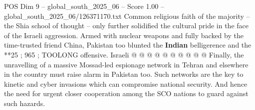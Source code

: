 \begin{textsample}{POS Dim 9 – global\_south\_2025\_06 – Score 1.00 – global\_south\_2025\_06/126371170.txt}
Common religious faith of the majority -- the Shia school of thought -- only further solidified the cultural pride in the face of the Israeli aggression.
Armed with nuclear weapons and fully backed by the time-trusted friend China, Pakistan too blunted the \textbf{Indian} belligerence and the **25 ; 965 ; TOOLONG offensive.
Israeli @ @ @ @ @ @ @ @ @ @ Finally, the unravelling of a massive Mossad-led espionage network in Tehran and elsewhere in the country must raise alarm in Pakistan too.
Such networks are the key to kinetic and cyber invasions which can compromise national security.
And hence the need for urgent closer cooperation among the SCO nations to guard against such hazards.

\end{textsample}

